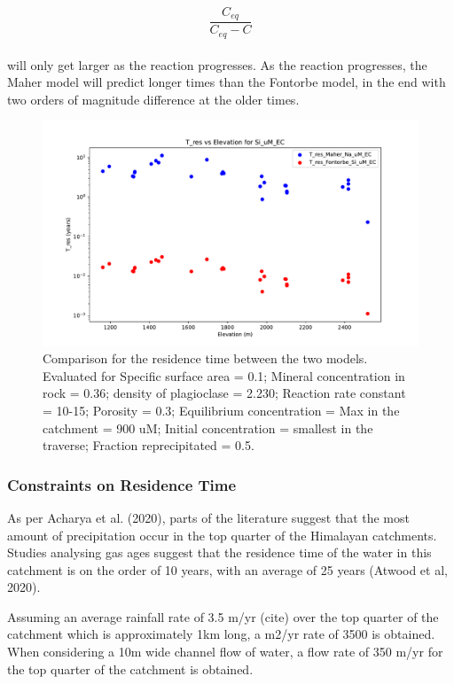 \[
\frac{C_{eq}}{C_{eq} - C}
\]\\

will only get larger as the reaction progresses. As the reaction progresses, the Maher model will predict longer times than the Fontorbe model, in the end with two orders of magnitude difference at the older times.\\ 


\begin{figure}[h]
    \centering
    \includegraphics[width=\textwidth]{T_res_Si_uM_EC_comparison.pdf}
    \caption{Comparison for the residence time between the two models. Evaluated for Specific surface area = 0.1; Mineral concentration in rock = 0.36; density of plagioclase = 2.230; Reaction rate constant = 10-15; Porosity = 0.3; Equilibrium concentration = Max in the catchment = 900 uM; Initial concentration = smallest in the traverse; Fraction reprecipitated = 0.5.}
    \label{fig:discussion7}
\end{figure}

\FloatBarrier


\subsubsection{Constraints on Residence Time}

As per Acharya et al. (2020), parts of the literature suggest that the most amount of precipitation occur in the top quarter of the Himalayan catchments. Studies analysing gas ages %
suggest that the residence time of the water in this catchment is on the order of 10 years, with an average of 25 years (Atwood et al, 2020). 

\bsk

Assuming an average rainfall rate of 3.5 m/yr (cite) over the top quarter of the catchment which is approximately 1km long, a m2/yr rate of 3500 is obtained. When considering a 10m wide channel flow of water, a flow rate of 350 m/yr for the top quarter of the catchment is obtained.


